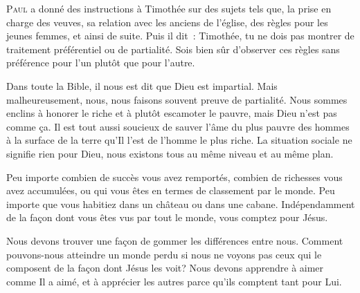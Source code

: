 
\lettrine{P}{aul} a donné des instructions à Timothée
 sur des sujets tels que, la prise en charge des veuves,
 sa relation avec les anciens de l'église, des règles pour les jeunes femmes,
 et ainsi de suite. Puis il dit~: 
 \og Timothée, 
 tu ne dois pas montrer de traitement préférentiel ou de partialité.
 Sois bien sûr d'observer ces règles sans préférence pour l'un plutôt
 que pour l'autre. \fg{}

Dans toute la Bible, il nous est dit que Dieu est impartial.
 Mais malheureusement, nous, nous faisons souvent preuve de partialité.
 Nous sommes enclins à honorer le riche et à plutôt escamoter le pauvre,
 mais Dieu n'est pas comme ça. Il est tout aussi soucieux de sauver l'âme
 du plus pauvre des hommes à la surface de la terre qu'Il l'est de l'homme
 le plus riche. La situation sociale ne signifie rien pour Dieu,
 nous existons tous au même niveau et au même plan. 


Peu importe combien de succès vous avez remportés, combien de richesses
 vous avez accumulées, ou qui vous êtes en termes de classement par le monde.
 Peu importe que vous habitiez dans un château ou dans une cabane.
 Indépendamment de la façon dont vous êtes vus par tout le monde,
 vous comptez pour Jésus. 

Nous devons trouver une façon de gommer les différences entre nous.
 Comment pouvons-nous atteindre un monde perdu si nous ne voyons pas
 ceux qui le composent de la façon dont Jésus les voit?
 Nous devons apprendre à aimer comme Il a aimé, et à apprécier les autres
 parce qu'ils comptent tant pour Lui.

\dvrule







